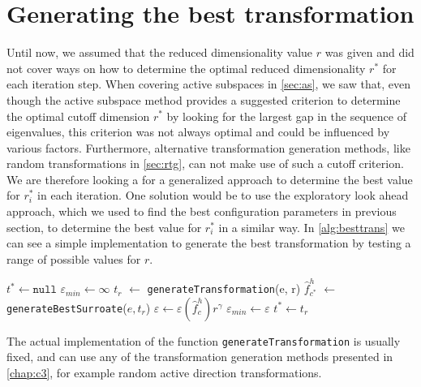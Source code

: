 \documentclass[
  a4paper,  %
  twoside,  %
  bibliography=totoc,
  headsepline,
  cleardoublepage=empty,
  parskip=half,
  draft=false
]{scrbook}
\begin{document}
\section{Generating the best transformation}
\label{sec:trans_gen}

Until now, we assumed that the reduced dimensionality value $r$ was given and did not cover ways on how to determine the optimal reduced dimensionality $r^\ast$ for each iteration step.
When covering active subspaces in \cref{sec:as}, we saw that, even though the active subspace method provides a suggested criterion to determine the optimal cutoff dimension $r^\ast$ by looking for the largest gap in the sequence of eigenvalues, this criterion was not always optimal and could be influenced by various factors.
Furthermore, alternative transformation generation methods, like random transformations in \cref{sec:rtg}, can not make use of such a cutoff criterion.
We are therefore looking a for a generalized approach to determine the best value for $r^\ast_i$ in each iteration.
One solution would be to use the exploratory look ahead approach, which we used to find the best configuration parameters in previous section, to determine the best value for $r^\ast_i$ in a similar way.
In \cref{alg:besttrans} we can see a simple implementation to generate the best transformation by testing a range of possible values for $r$. 

\newpage

\begin{mdframed}[style=algstyle,frametitle={\textbf{function} \texttt{generateBestTransformation}{$(e, r_{\text{min}} ,r_{\text{max}}, \gamma)$}}]
\normalsize
\vspace{5.5mm}
\begin{algorithmic}[1]
    \State $t^\ast \gets \texttt{null}$
    \State $\varepsilon_{min} \gets \infty$
      \State $t_r$ $\gets$ \texttt{generateTransformation}(e, r)
      \State $\hat{f}_{c^\ast}^h$ $\gets$ \texttt{generateBestSurroate}($e, t_r$)
    	\State $\varepsilon \gets \varepsilon(\hat{f}_c^h) r^\gamma$
    	  \State $\varepsilon_{min}\gets \varepsilon$
    	\State $t^\ast \gets t_r$
    	\EndIf
    \EndFor
    \State {}
\end{algorithmic}
\vspace{-1.5mm}
\delimit
	\label{alg:besttrans}
\end{mdframed}
%
The actual implementation of the function \texttt{generateTransformation} is usually fixed, and can use any of the transformation generation methods presented in \cref{chap:c3}, for example random active direction transformations.
\end{document}
